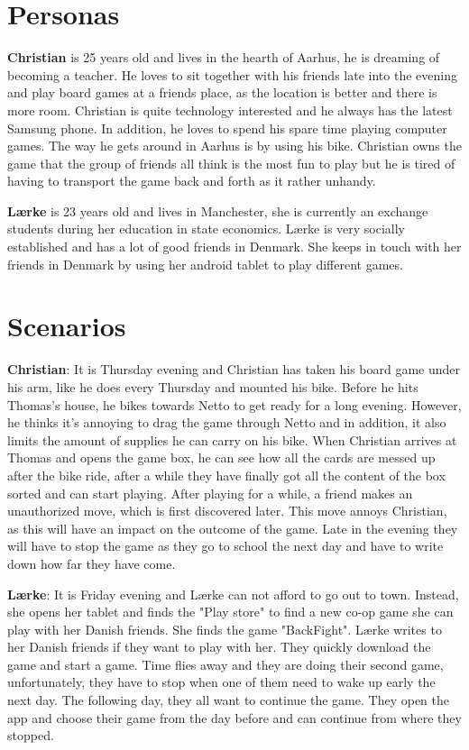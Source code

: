 \section{Personas}
\textbf{Christian} is 25 years old and lives in the hearth of Aarhus, he is dreaming of becoming a teacher. He loves to sit together with his friends late into the evening and play board games at a friends place, as the location is better and there is more room. Christian is quite technology interested and he always has the latest Samsung phone. In addition, he loves to spend his spare time playing computer games. The way he gets around in Aarhus is by using his bike. Christian owns the game that the group of friends all think is the most fun to play but he is tired of having to transport the game back and forth as it rather unhandy.

\textbf{Lærke} is 23 years old and lives in Manchester, she is currently an exchange students during her education in state economics. Lærke is very socially established and has a lot of good friends in Denmark. She keeps in touch with her friends in Denmark by using her android tablet to play different games.

\section{Scenarios}
\textbf{Christian}:
It is Thursday evening and Christian has taken his board game under his arm, like he does every Thursday and mounted his bike. Before he hits Thomas's house, he bikes towards Netto to get ready for a long evening. However, he thinks it's annoying to drag the game through Netto and in addition, it also limits the amount of supplies he can carry on his bike. When Christian arrives at Thomas and opens the game box, he can see how all the cards are messed up after the bike ride, after a while they have finally got all the content of the box sorted and can start playing. After playing for a while, a friend makes an unauthorized move, which is first discovered later. This move annoys Christian, as this will have an impact on the outcome of the game. Late in the evening they will have to stop the game as they go to school the next day and have to write down how far they have come.

\textbf{Lærke}:
It is Friday evening and Lærke can not afford to go out to town. Instead, she opens her tablet and finds the "Play store" to find a new co-op game she can play with her Danish friends. She finds the game "BackFight". Lærke writes to her Danish friends if they want to play with her. They quickly download the game and start a game. Time flies away and they are doing their second game, unfortunately, they have to stop when one of them need to wake up early the next day. The following day, they all want to continue the game. They open the app and choose their game from the day before and can continue from where they stopped.

